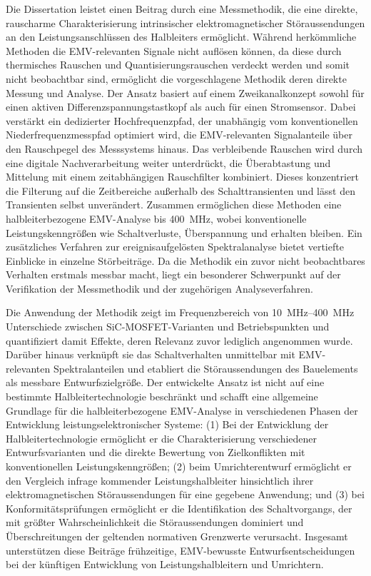 Die Dissertation leistet einen Beitrag durch eine Messmethodik, die eine direkte, rauscharme Charakterisierung intrinsischer elektromagnetischer Störaussendungen an den Leistungsanschlüssen des Halbleiters ermöglicht.
Während herkömmliche Methoden die EMV-relevanten Signale nicht auflösen können, da diese durch thermisches Rauschen und Quantisierungsrauschen verdeckt werden und somit nicht beobachtbar sind, ermöglicht die vorgeschlagene Methodik deren direkte Messung und Analyse.
Der Ansatz basiert auf einem Zweikanalkonzept sowohl für einen aktiven Differenzspannungstastkopf als auch für einen Stromsensor. Dabei verstärkt ein dedizierter Hochfrequenzpfad, der unabhängig vom konventionellen Niederfrequenzmesspfad optimiert wird, die EMV-relevanten Signalanteile über den Rauschpegel des Messsystems hinaus.
Das verbleibende Rauschen wird durch eine digitale Nachverarbeitung weiter unterdrückt, die Überabtastung und Mittelung mit einem zeitabhängigen Rauschfilter kombiniert. Dieses konzentriert die Filterung auf die Zeitbereiche außerhalb des Schalttransienten und lässt den Transienten selbst unverändert.
Zusammen ermöglichen diese Methoden eine halbleiterbezogene EMV-Analyse bis \SI{400}{MHz}, wobei konventionelle Leistungskenngrößen wie Schaltverluste, Überspannung und  erhalten bleiben.
Ein zusätzliches Verfahren zur ereignisaufgelösten Spektralanalyse bietet vertiefte Einblicke in einzelne Störbeiträge.
Da die Methodik ein zuvor nicht beobachtbares Verhalten erstmals messbar macht, liegt ein besonderer Schwerpunkt auf der Verifikation der Messmethodik und der zugehörigen Analyseverfahren.

Die Anwendung der Methodik zeigt im Frequenzbereich von \SIrange{10}{400}{MHz} Unterschiede zwischen SiC-MOSFET-Varianten und Betriebspunkten und quantifiziert damit Effekte, deren Relevanz zuvor lediglich angenommen wurde.
Darüber hinaus verknüpft sie das Schaltverhalten unmittelbar mit EMV-relevanten Spektralanteilen und etabliert die Störaussendungen des Bauelements als messbare Entwurfszielgröße.
Der entwickelte Ansatz ist nicht auf eine bestimmte Halbleitertechnologie beschränkt und schafft eine allgemeine Grundlage für die halbleiterbezogene EMV-Analyse in verschiedenen Phasen der Entwicklung leistungselektronischer Systeme:
(1) Bei der Entwicklung der Halbleitertechnologie ermöglicht er die Charakterisierung verschiedener Entwurfsvarianten und die direkte Bewertung von Zielkonflikten mit konventionellen Leistungskenngrößen;
(2) beim Umrichterentwurf ermöglicht er den Vergleich infrage kommender Leistungshalbleiter hinsichtlich ihrer elektromagnetischen Störaussendungen für eine gegebene Anwendung; und
(3) bei Konformitätsprüfungen ermöglicht er die Identifikation des Schaltvorgangs, der mit größter Wahrscheinlichkeit die Störaussendungen dominiert und Überschreitungen der geltenden normativen Grenzwerte verursacht.
Insgesamt unterstützen diese Beiträge frühzeitige, EMV-bewusste Entwurfsentscheidungen bei der künftigen Entwicklung von Leistungshalbleitern und Umrichtern.

